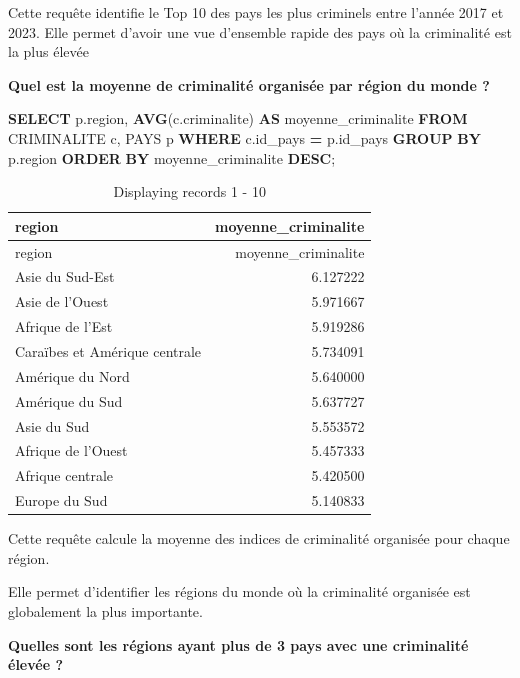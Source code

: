 \documentclass[mstat,12pt]{unswthesis}
\newenvironment{Shaded}{\begin{snugshade}}{\end{snugshade}}
\newcommand{\FunctionTok}[1]{\textcolor[rgb]{0.13,0.29,0.53}{\textbf{#1}}}
\newcommand{\KeywordTok}[1]{\textcolor[rgb]{0.13,0.29,0.53}{\textbf{#1}}}
\newcommand{\NormalTok}[1]{#1}
\newcommand{\OperatorTok}[1]{\textcolor[rgb]{0.81,0.36,0.00}{\textbf{#1}}}
\begin{document}
Cette requête identifie le Top 10 des pays les plus criminels entre
l'année 2017 et 2023. Elle permet d'avoir une vue d'ensemble rapide des
pays où la criminalité est la plus élevée

\medskip

\textbf{Quel est la moyenne de criminalité organisée par région du monde
?}

\begin{Shaded}
\begin{Highlighting}[]
\KeywordTok{SELECT}\NormalTok{ p.region, }\FunctionTok{AVG}\NormalTok{(c.criminalite) }\KeywordTok{AS}\NormalTok{ moyenne\_criminalite}
\KeywordTok{FROM}\NormalTok{ CRIMINALITE c, PAYS p}
\KeywordTok{WHERE}\NormalTok{ c.id\_pays }\OperatorTok{=}\NormalTok{ p.id\_pays}
\KeywordTok{GROUP} \KeywordTok{BY}\NormalTok{ p.region}
\KeywordTok{ORDER} \KeywordTok{BY}\NormalTok{ moyenne\_criminalite }\KeywordTok{DESC}\NormalTok{;}
\end{Highlighting}
\end{Shaded}

\begin{longtable}[]{@{}lr@{}}
\caption{Displaying records 1 - 10}\tabularnewline
\toprule\noalign{}
region & moyenne\_criminalite \\
\midrule\noalign{}
\endfirsthead
\toprule\noalign{}
region & moyenne\_criminalite \\
\midrule\noalign{}
\endhead
\bottomrule\noalign{}
\endlastfoot
Asie du Sud-Est & 6.127222 \\
Asie de l'Ouest & 5.971667 \\
Afrique de l'Est & 5.919286 \\
Caraïbes et Amérique centrale & 5.734091 \\
Amérique du Nord & 5.640000 \\
Amérique du Sud & 5.637727 \\
Asie du Sud & 5.553572 \\
Afrique de l'Ouest & 5.457333 \\
Afrique centrale & 5.420500 \\
Europe du Sud & 5.140833 \\
\end{longtable}

Cette requête calcule la moyenne des indices de criminalité organisée
pour chaque région.

Elle permet d'identifier les régions du monde où la criminalité
organisée est globalement la plus importante.

\textbf{Quelles sont les régions ayant plus de 3 pays avec une
criminalité élevée ?}
\end{document}
